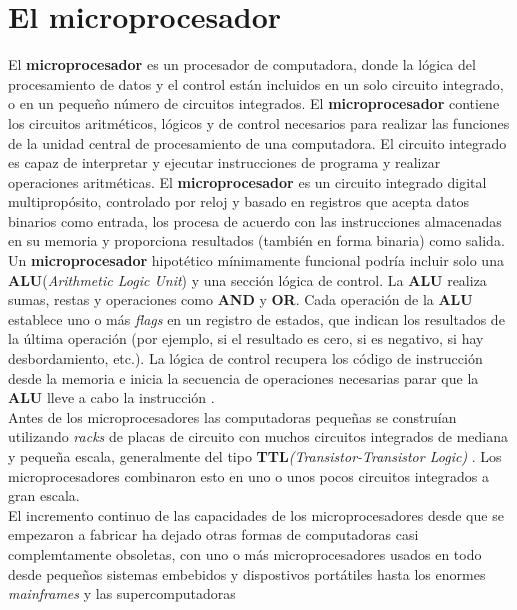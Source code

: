 \chapter{El microprocesador}\label{chapter:microprocesador}

El \textbf{microprocesador} es un procesador de computadora, donde la lógica del procesamiento de datos y el control
están incluidos en un solo circuito integrado, o en un pequeño número de circuitos integrados. El \textbf{microprocesador}
contiene los circuitos aritméticos, lógicos y de control necesarios para realizar las funciones de la unidad central de
procesamiento  de una computadora. El circuito integrado es capaz de interpretar y ejecutar instrucciones de programa y
realizar operaciones aritméticas. El \textbf{microprocesador} es un circuito integrado digital multipropósito, controlado
por reloj y basado en registros que acepta datos binarios como entrada, los procesa de acuerdo con las instrucciones
almacenadas en su memoria y proporciona resultados (también en forma binaria) como salida. Un \textbf{microprocesador}
hipotético mínimamente funcional podría incluir solo una \textbf{ALU}(\emph{Arithmetic Logic Unit}) y una sección lógica
de control. La \textbf{ALU} realiza sumas, restas y operaciones como \textbf{AND} y \textbf{OR}. Cada operación de la
\textbf{ALU} establece uno o más \emph{flags} en un registro de estados, que indican los resultados de la última operación
(por ejemplo, si el resultado es cero, si es negativo, si hay desbordamiento, etc.). La lógica de control recupera los
código de instrucción desde la memoria e inicia la secuencia de operaciones necesarias parar que la \textbf{ALU} lleve a
cabo la instrucción .\\ Antes de los microprocesadores las computadoras pequeñas
se construían utilizando  \emph{racks} de placas de circuito con muchos circuitos integrados de mediana y pequeña escala,
generalmente del tipo \textbf{TTL}\emph{(Transistor-Transistor Logic)} . Los microprocesadores
combinaron esto en uno o unos pocos circuitos integrados a gran escala.\\ El incremento continuo de las capacidades de los
microprocesadores desde  que se empezaron a fabricar ha dejado otras formas de computadoras casi complemtamente obsoletas,
con uno o más microprocesadores usados en todo desde pequeños sistemas embebidos y dispostivos portátiles hasta los enormes
\emph{mainframes} y las supercomputadoras

